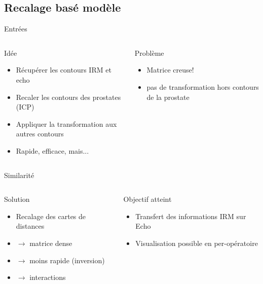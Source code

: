\documentclass{beamer}
\begin{document}
\subsection{Recalage basé modèle}
\begin{frame}{Entrées}
\centering
   \begin{columns}[c]
 \begin{column}{0.5\textwidth}
\begin{block}{Idée}
\begin{itemize}
  \item Récupérer les contours IRM et echo
  \item Recaler les contours des prostates (ICP)
  \item Appliquer la transformation aux autres contours
  \item Rapide, efficace, mais...
  \end{itemize}
\end{block}
 \end{column}
 \begin{column}{0.5\textwidth}
 \centering
\begin{alertblock}{Problème}
\begin{itemize}
  \item Matrice creuse!
  \item pas de transformation hors contours de la prostate
  \end{itemize}
\end{alertblock}
\end{column}
\end{columns} 
\end{frame}

\begin{frame}{Similarité}
\centering
   \begin{columns}[c]
 \begin{column}{0.5\textwidth}
\begin{block}{Solution}
\begin{itemize}
  \item Recalage des cartes de distances
  \item $\rightarrow$ matrice dense
  \item $\rightarrow$ moins rapide (inversion)
  \item $\rightarrow$ interactions
  \end{itemize}
\end{block}
 \end{column}
 \begin{column}{0.5\textwidth}
 \centering
\begin{exampleblock}{Objectif atteint}
\begin{itemize}
  \item Transfert des informations IRM sur Echo
  \item Visualisation possible en per-opératoire
  \end{itemize}
\end{exampleblock}
\end{column}
\end{columns} 
\end{frame}
\end{document}
